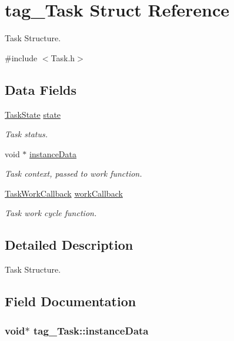\hypertarget{structtag___task}{\section{tag\+\_\+\+Task Struct Reference}
\label{structtag___task}
}


Task Structure.  




{\ttfamily \#include $<$Task.\+h$>$}

\subsection*{Data Fields}
\begin{DoxyCompactItemize}
\item 
\hyperlink{_task_8h_a72a5e74cf680503ec09223c3cfdbf4e3}{Task\+State} \hyperlink{structtag___task_a9c1ed76fb17998c5d0eaea9476aca301}{state}
\begin{DoxyCompactList}\small\item\em Task status. \end{DoxyCompactList}\item 
void $\ast$ \hyperlink{structtag___task_a02bd6ed13271438c11b932a061b59f0c}{instance\+Data}
\begin{DoxyCompactList}\small\item\em Task context, passed to work function. \end{DoxyCompactList}\item 
\hyperlink{_task_8h_a8f3c61c0430299673ab83bf936073184}{Task\+Work\+Callback} \hyperlink{structtag___task_ad633bdb373da2f8a144e8a7927cb3630}{work\+Callback}
\begin{DoxyCompactList}\small\item\em Task work cycle function. \end{DoxyCompactList}\end{DoxyCompactItemize}


\subsection{Detailed Description}
Task Structure. 

\subsection{Field Documentation}
\hypertarget{structtag___task_a02bd6ed13271438c11b932a061b59f0c}{
\subsubsection[{instance\+Data}]{\setlength{\rightskip}{0pt plus 5cm}void$\ast$ tag\+\_\+\+Task\+::instance\+Data}}\label{structtag___task_a02bd6ed13271438c11b932a061b59f0c}


